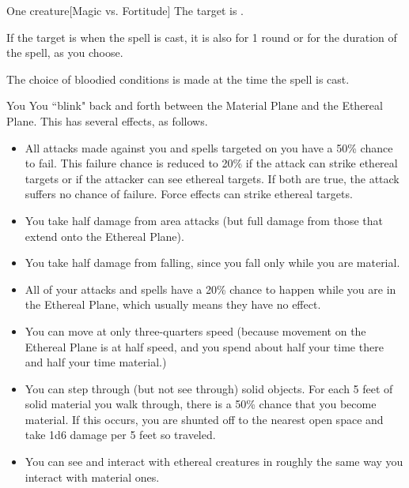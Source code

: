 \spellrng{\rngmed}
\spelldur{\durshort \dismissable}
\begin{spelltarget}{One creature}[Magic vs. Fortitude]
    \spellsuccess The target is \sickened.

    If the target is \bloodied when the spell is cast, it is also \blinded for 1 round or \deafened for the duration of the spell, as you choose.
\end{spelltarget}
\spellnotes The choice of bloodied conditions is made at the time the spell is cast.

\spellrng{\rngpers}
\spelldur{\durshort \dismissable}
\begin{spelltarget}{You}
    \spelleffect You ``blink" back and forth between the Material Plane and the Ethereal Plane. This has several effects, as follows.
    \begin{itemize}
        \item All attacks made against you and spells targeted on you have a 50\% chance to fail. This failure chance is reduced to 20\% if the attack can strike ethereal targets or if the attacker can see ethereal targets. If both are true, the attack suffers no chance of failure. Force effects can strike ethereal targets.
        \item You take half damage from area attacks (but full damage from those that extend onto the Ethereal Plane).
        \item You take half damage from falling, since you fall only while you are material.
        \item All of your attacks and spells have a 20\% chance to happen while you are in the Ethereal Plane, which usually means they have no effect.
        \item You can move at only three-quarters speed (because movement on the Ethereal Plane is at half speed, and you spend about half your time there and half your time material.)
        \item You can step through (but not see through) solid objects. For each 5 feet of solid material you walk through, there is a 50\% chance that you become material. If this occurs, you are shunted off to the nearest open space and take 1d6 damage per 5 feet so traveled. 
        \item You can see and interact with ethereal creatures in roughly the same way you interact with material ones.
    \end{itemize}
\end{spelltarget}

